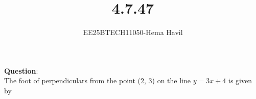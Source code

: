 \documentclass[journal]{IEEEtran}
\begin{document}

\vspace{3cm}
\title{4.7.47}
\author{EE25BTECH11050-Hema Havil}
	\maketitle
	{\let\newpage\relax\maketitle}
	
	\renewcommand{\thefigure}{\theenumi}
	\renewcommand{\thetable}{\theenumi}
	\setlength{\intextsep}{12pt} %
	
	\renewcommand{\thetable}{\theenumi}
	
	\textbf{Question}:\\
    
         The foot of perpendiculars from the point (2, 3) on the line $y = 3x + 4$ is given by
         
\end{document}
